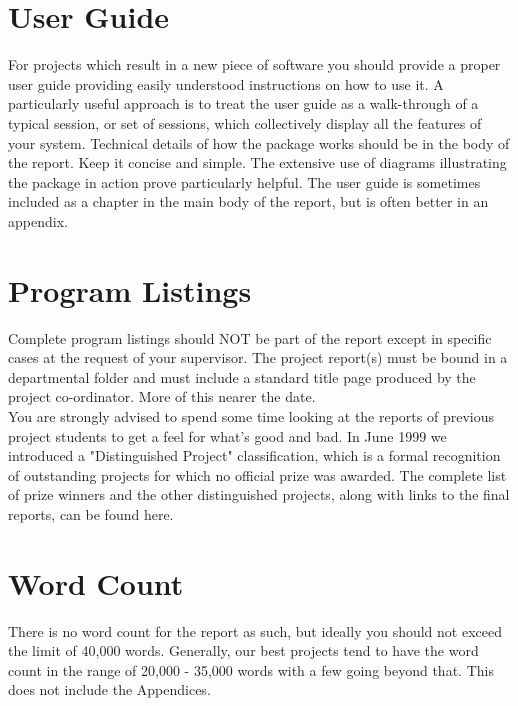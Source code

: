 \documentclass[12pt,twoside]{article}
\begin{document}
\newpage





\section{User Guide}



For projects which result in a new piece of software you should provide a proper user guide providing easily understood instructions on how to use it. A particularly useful approach is to treat the user guide as a walk-through of a typical session, or set of sessions, which collectively display all the features of your system. Technical details of how the package works should be in the body of the report. Keep it concise and simple. The extensive use of diagrams illustrating the package in action prove particularly helpful. The user guide is sometimes included as a chapter in the main body of the report, but is often better in an appendix.\\


\newpage





\section{Program Listings}


Complete program listings should NOT be part of the report except in specific cases at the request of your supervisor. The project report(s) must be bound in a departmental folder and must include a standard title page produced by the project co-ordinator. More of this nearer the date.\\
You are strongly advised to spend some time looking at the reports of previous project students to get a feel for what's good and bad. In June 1999 we introduced a "Distinguished Project" classification, which is a formal recognition of outstanding projects for which no official prize was awarded. The complete list of prize winners and the other distinguished projects, along with links to the final reports, can be found here.\\

\newpage

\section{Word Count}



There is no word count for the report as such, but ideally you should not exceed the limit of 40,000 words. Generally, our best projects tend to have the word count in the range of 20,000 - 35,000 words with a few going beyond that. This does not include the Appendices.\\





\end{document}
